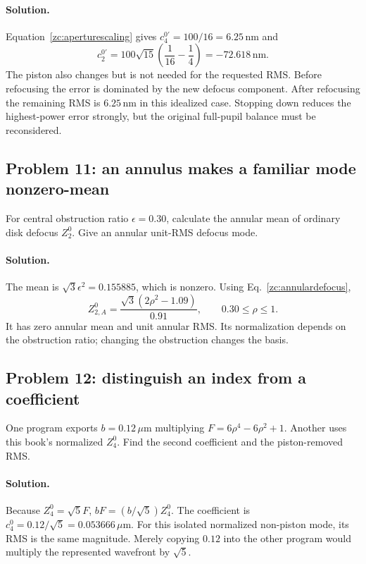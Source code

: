 \paragraph{Solution.}
Equation~\eqref{zc:aperturescaling} gives
$c_4^{0\prime}=100/16=6.25\,\mathrm{nm}$ and
\begin{equation}
 c_2^{0\prime}=100\sqrt{15}\left(\frac1{16}-\frac14\right)
                  =-72.618\,\mathrm{nm}.
\end{equation}
The piston also changes but is not needed for the requested RMS.
Before refocusing the error is dominated by the new defocus component.
After refocusing the remaining RMS is $6.25\,\mathrm{nm}$ in this
idealized case. Stopping down reduces the highest-power error strongly,
but the original full-pupil balance must be reconsidered.

\subsection*{Problem 11: an annulus makes a familiar mode nonzero-mean}
For central obstruction ratio $\epsilon=0.30$, calculate the annular
mean of ordinary disk defocus $Z_2^0$. Give an annular unit-RMS
defocus mode.

\paragraph{Solution.}
The mean is $\sqrt3\epsilon^2=0.155885$, which is nonzero.
Using Eq.~\eqref{zc:annulardefocus},
\begin{equation}
 Z_{2,A}^0=\frac{\sqrt3(2\rho^2-1.09)}{0.91},
 \qquad0.30\leq\rho\leq1.
\end{equation}
It has zero annular mean and unit annular RMS. Its normalization
depends on the obstruction ratio; changing the obstruction changes
the basis.

\subsection*{Problem 12: distinguish an index from a coefficient}
One program exports $b=0.12\,\mu\mathrm m$ multiplying
$F=6\rho^4-6\rho^2+1$. Another uses this book's normalized
$Z_4^0$. Find the second coefficient and the piston-removed RMS.

\paragraph{Solution.}
Because $Z_4^0=\sqrt5F$,
$bF=(b/\sqrt5)Z_4^0$. The coefficient is
$c_4^0=0.12/\sqrt5=0.053666\,\mu\mathrm m$.
For this isolated normalized non-piston mode, its RMS is the same
magnitude. Merely copying $0.12$ into the other program would multiply
the represented wavefront by $\sqrt5$.

